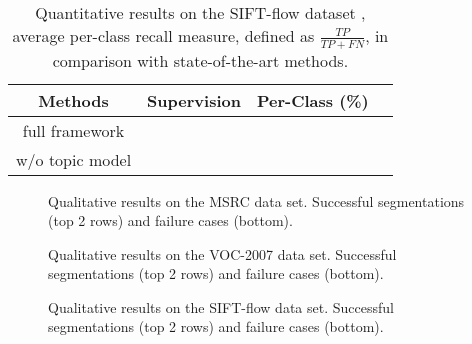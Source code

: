 \begin{table}[!h]
\begin{center}
\begin{tabular}{|c|c|c|c|}
\hline
Methods & Supervision & Per-Class (\%)& \\
\hline
full framework & \\
\hline
w/o topic model &  \\
\hline
\end{tabular}
\end{center}
\caption{Quantitative results on the SIFT-flow dataset \cite{liu2011nonparametric}, average per-class recall measure, defined as $\frac{TP}{TP+FN}$, in comparison with state-of-the-art methods. }
\label{tab:ExpNoise}
\end{table}








\begin{figure*}
\begin{center}
\fbox{\rule{0pt}{2in} \rule{.9\linewidth}{0pt}}
\end{center}
   \caption{Qualitative results on the MSRC data set. Successful segmentations (top 2 rows) and failure cases (bottom).}
\label{fig:MSRC}
\end{figure*}

\begin{figure*}
\begin{center}
\fbox{\rule{0pt}{2in} \rule{.9\linewidth}{0pt}}
\end{center}
   \caption{Qualitative results on the VOC-2007 data set. Successful segmentations (top 2 rows) and failure cases (bottom).}
\label{fig:VOC-2007}
\end{figure*}

\begin{figure*}
\begin{center}
\fbox{\rule{0pt}{2in} \rule{.9\linewidth}{0pt}}
\end{center}
   \caption{Qualitative results on the SIFT-flow data set. Successful segmentations (top 2 rows) and failure cases (bottom).}
\label{fig:SIFT-flow}
\end{figure*}


